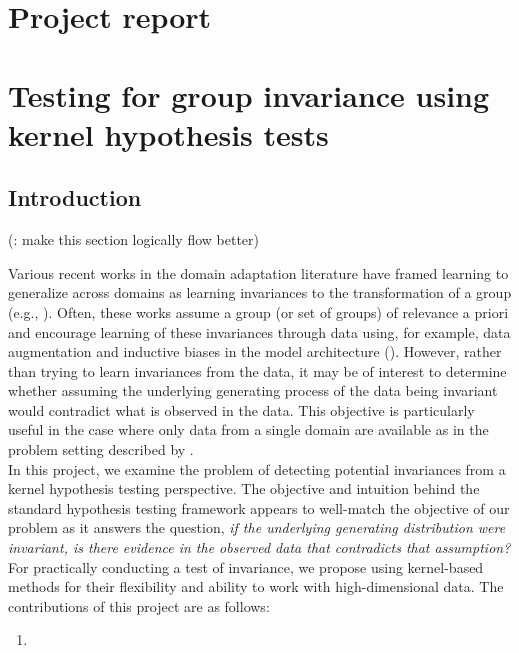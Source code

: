 

\section{Project report}
\vspace{1em}

\section*{Testing for group invariance using kernel hypothesis tests}
\vspace{1em}

\begin{abstract}
\todo
\end{abstract}


\subsection{Introduction}

(\todo: make this section logically flow better)

Various recent works in the domain adaptation literature have framed learning to generalize across domains as learning invariances to the transformation of a group (e.g., \parencite{Mouli:2021,Schwobel:2021} \todo). Often, these works assume a group (or set of groups) of relevance a priori and encourage learning of these invariances through data using, for example, data augmentation and inductive biases in the model architecture (\todo). However, rather than trying to learn invariances from the data, it may be of interest to determine whether assuming the underlying generating process of the data being invariant would contradict what is observed in the data. This objective is particularly useful in the case where only data from a single domain are available as in the problem setting described by \textcite{Mouli:2021}.
\\

In this project, we examine the problem of detecting potential invariances from a kernel hypothesis testing perspective. The objective and intuition behind the standard hypothesis testing framework appears to well-match the objective of our problem as it answers the question, \textit{if the underlying generating distribution were invariant, is there evidence in the observed data that contradicts that assumption?} For practically conducting a test of invariance, we propose using kernel-based methods for their flexibility and ability to work with high-dimensional data. The contributions of this project are as follows:
\begin{enumerate}

\item

\end{enumerate}

